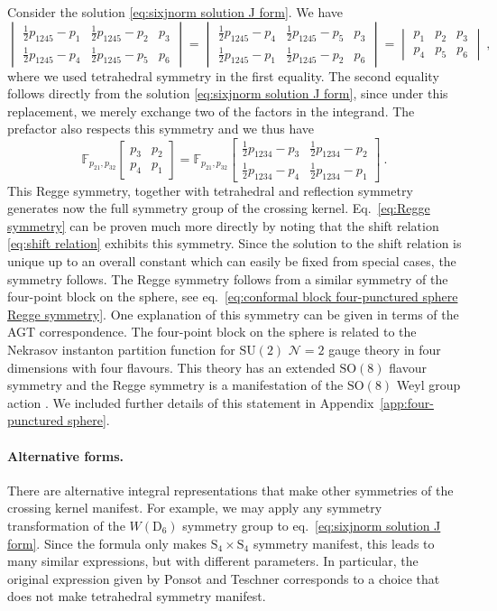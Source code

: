 \documentclass[12pt,a4paper]{article}
\newcommand{\be}{\begin{equation}}
\newcommand{\ee}{\end{equation}}
\newcommand{\sixjnorm}[6]{\begin{vmatrix}
#1 & #2 & #3 \\
#4 & #5 & #6
\end{vmatrix}
}
\begin{document}
Consider the solution \eqref{eq:sixjnorm solution J form}. We have
\be 
\sixjnorm{\frac{1}{2}p_{1245}-p_1}{\frac{1}{2}p_{1245}-p_2}{p_3}{\frac{1}{2}p_{1245}-p_4}{\frac{1}{2}p_{1245}-p_5}{p_6}=\sixjnorm{\frac{1}{2}p_{1245}-p_4}{\frac{1}{2}p_{1245}-p_5}{p_3}{\frac{1}{2}p_{1245}-p_1}{\frac{1}{2}p_{1245}-p_2}{p_6}=\sixjnorm{p_1}{p_2}{p_3}{p_4}{p_5}{p_6}\ ,
\ee
where we used tetrahedral symmetry in the first equality. The second equality follows directly from the solution \eqref{eq:sixjnorm solution J form}, since under this replacement, we merely exchange two of the factors in the integrand. The prefactor also respects this symmetry and we thus have
\be 
\mathbb{F}_{p_{21},p_{32}}\!\begin{bmatrix}
    p_3 & p_2 \\
    p_4 & p_1
\end{bmatrix}=\mathbb{F}_{p_{21},p_{32}}\!\begin{bmatrix}
    \frac{1}{2}p_{1234}-p_3 & \frac{1}{2}p_{1234}-p_2 \\
    \frac{1}{2}p_{1234}-p_4 & \frac{1}{2}p_{1234}-p_1
\end{bmatrix}\ . \label{eq:Regge symmetry}
\ee
This Regge symmetry, together with tetrahedral and reflection symmetry generates now the full symmetry group of the crossing kernel. Eq.~\eqref{eq:Regge symmetry} can be proven much more directly by noting that the shift relation \eqref{eq:shift relation} exhibits this symmetry. Since the solution to the shift relation is unique up to an overall constant which can easily be fixed from special cases, the symmetry follows. 
The Regge symmetry follows from a similar symmetry of the four-point block on the sphere, see eq.~\eqref{eq:conformal block four-punctured sphere Regge symmetry}. One explanation of this symmetry can be given in terms of the AGT correspondence. The four-point block on the sphere is related to the Nekrasov instanton partition function \cite{Nekrasov:2002qd} for $\mathrm{SU}(2)$ $\mathcal{N}=2$ gauge theory in four dimensions with four flavours. This theory has an extended $\mathrm{SO}(8)$ flavour symmetry and the Regge symmetry is a manifestation of the $\mathrm{SO}(8)$ Weyl group action \cite{Giribet:2009hm}. We included further details of this statement in Appendix~\ref{app:four-punctured sphere}.



\paragraph{Alternative forms.} There are alternative integral representations that make other symmetries of the crossing kernel manifest. For example, we may apply any symmetry transformation of the $W(\mathrm{D}_6)$ symmetry group to eq.~\eqref{eq:sixjnorm solution J form}. Since the formula only makes $\mathrm{S}_4 \times \mathrm{S}_4$ symmetry manifest, this leads to many similar expressions, but with different parameters. In particular, the original expression given by Ponsot and Teschner \cite{Ponsot:1999uf} corresponds to a choice that does not make tetrahedral symmetry manifest.
\end{document}
